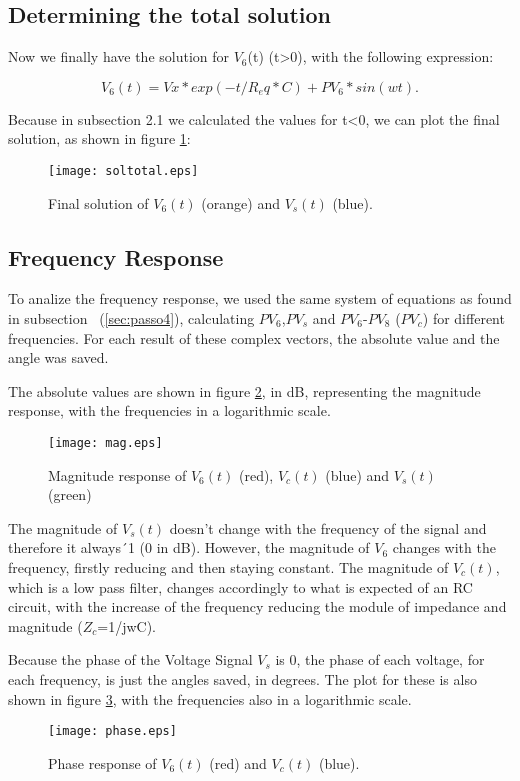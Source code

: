 \subsection{Determining the total solution}

Now we finally have the solution for $V_6$(t) (t>0), with the following expression:

\begin{equation}
  V_6(t)=Vx*exp(-t/R_eq*C)+PV_6*sin(wt).
  \label{eq:totalsol}
\end{equation}

Because in subsection 2.1 we calculated the values for t<0, we can plot the final solution, as shown in figure \ref{fig:soltotal}:

\begin{figure}[h] \centering
\texttt{[image: soltotal.eps]}
\caption{Final solution of $V_6(t)$ (orange) and $V_s(t)$ (blue).}
\label{fig:soltotal}
\end{figure}


\subsection{Frequency Response}

To analize the frequency response, we used the same system of equations as found in subsection ~(\ref{sec:passo4}), calculating $PV_6$,$PV_s$ and $PV_6$-$PV_8$ ($PV_c$) for different frequencies. For each result of these complex vectors, the absolute value and the angle was saved. 

The absolute values are shown in figure \ref{fig:mag}, in dB, representing the magnitude response, with the frequencies in a logarithmic scale.

\begin{figure}[h] \centering
\texttt{[image: mag.eps]}
\caption{Magnitude response of $V_6(t)$ (red), $V_c(t)$ (blue) and $V_s(t)$ (green)}
\label{fig:mag}
\end{figure}

The magnitude of $V_s(t)$ doesn't change with the frequency of the signal and therefore it always´1 (0 in dB). However, the magnitude of $V_6$ changes with the frequency, firstly reducing and then staying constant. The magnitude of $V_c(t)$, which is a low pass filter, changes accordingly to what is expected of an RC circuit, with the increase of the frequency reducing the module of impedance and magnitude ($Z_c$=1/jwC).

Because the phase of the Voltage Signal $V_s$ is 0, the phase of each voltage, for each frequency, is just the angles saved, in degrees. The plot for these is also shown in figure \ref{fig:phase}, with the frequencies also in a logarithmic scale.

\begin{figure}[h] \centering
\texttt{[image: phase.eps]}
\caption{Phase response of $V_6(t)$ (red) and $V_c(t)$ (blue).}
\label{fig:phase}
\end{figure}

























